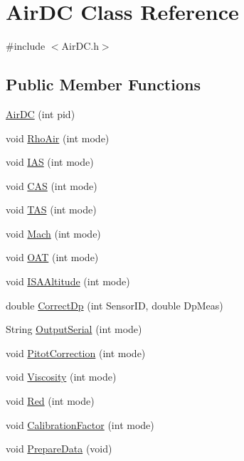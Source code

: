 \hypertarget{class_air_d_c}{}\section{Air\+DC Class Reference}
\label{class_air_d_c}


{\ttfamily \#include $<$Air\+D\+C.\+h$>$}

\subsection*{Public Member Functions}
\begin{DoxyCompactItemize}
\item 
\hyperlink{class_air_d_c_ad8fd49af8bf2b7db4dee29fe9bc28bb6}{Air\+DC} (int pid)
\item 
void \hyperlink{class_air_d_c_a89f74a0f980a2891d10f4e5637ddbc40}{Rho\+Air} (int mode)
\item 
void \hyperlink{class_air_d_c_af26c8e8ef7fa070a72f0a5777cf91ec0}{I\+AS} (int mode)
\item 
void \hyperlink{class_air_d_c_a7ff5cc226ca2b14d7c03fafef41e6a84}{C\+AS} (int mode)
\item 
void \hyperlink{class_air_d_c_ac5f852dcb7b32bf8b18f8dda9d1e7005}{T\+AS} (int mode)
\item 
void \hyperlink{class_air_d_c_a6e8f15eedeebbd094259bb38b9e0307a}{Mach} (int mode)
\item 
void \hyperlink{class_air_d_c_a4ce45312b9ac98b76af87f1718c4e0fc}{O\+AT} (int mode)
\item 
void \hyperlink{class_air_d_c_a1032c849abc753d30bb02b08d2809258}{I\+S\+A\+Altitude} (int mode)
\item 
double \hyperlink{class_air_d_c_af4044df1cd0d9b477f19b37f3cdc8836}{Correct\+Dp} (int Sensor\+ID, double Dp\+Meas)
\item 
String \hyperlink{class_air_d_c_a328439b2a9e401655b952d2a67931700}{Output\+Serial} (int mode)
\item 
void \hyperlink{class_air_d_c_a7b2dbfed69544bced169d425b55a9cd8}{Pitot\+Correction} (int mode)
\item 
void \hyperlink{class_air_d_c_a5c6e4f0974dbff73ea1bcdec01309193}{Viscosity} (int mode)
\item 
void \hyperlink{class_air_d_c_a4be77c1575a1ec53e6c2a7199942d3e2}{Red} (int mode)
\item 
void \hyperlink{class_air_d_c_ab324f87db272c1c9471b25536ba5e5bf}{Calibration\+Factor} (int mode)
\item 
void \hyperlink{class_air_d_c_a01cfc37b82ec5e4b1e568e4119a6b652}{Prepare\+Data} (void)
\end{DoxyCompactItemize}
